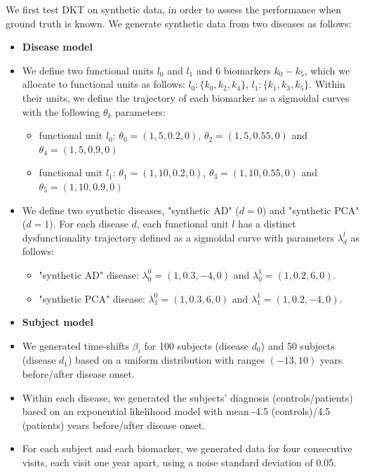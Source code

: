 We first test DKT on synthetic data, in order to assess the performance when ground truth is known. We generate synthetic data from two diseases as follows:
\begin{itemize}
 \item[] \textbf{Disease model}
 \item We define two functional units $l_0$ and $l_1$ and 6 biomarkers $k_0-k_5$, which we allocate to functional units as follows: $l_0:\{k_0, k_2, k_4\}$, $l_1: \{k_1, k_3, k_5\}$. Within their units, we define the trajectory of each biomarker as a sigmoidal curves with the following $\theta_k$ parameters:
 \begin{itemize}
  \item functional unit $l_0$: $\theta_0 = (1,5,0.2,0)$, $\theta_2 = (1,5,0.55,0)$ and $\theta_4 = (1,5,0.9,0)$ 
  \item functional unit $l_1$: $\theta_1 = (1,10,0.2,0)$, $\theta_3 = (1,10,0.55,0)$ and $\theta_5 = (1,10,0.9,0)$ 
 \end{itemize}
 \item We define two synthetic diseases, "synthetic AD" ($d=0$) and "synthetic PCA" ($d=1$). For each disease $d$, each functional unit $l$ has a distinct dysfunctionality trajectory defined as a sigmoidal curve with parameters $\lambda_d^l$ as follows: 
 \begin{itemize}
  \item "synthetic AD" disease: $\lambda_0^0 = (1, 0.3, -4, 0)$  and $\lambda_0^1 = (1, 0.2, 6, 0)$.
  \item "synthetic PCA" disease: $\lambda_1^0 = (1, 0.3, 6, 0)$ and $\lambda_1^1 = (1, 0.2, -4, 0)$.
 \end{itemize}

 \item[] \textbf{Subject model}
 \item We generated time-shifts $\beta_i$ for 100 subjects (disease $d_0$) and 50 subjects (disease $d_1$) based on a uniform distribution with ranges $(-13, 10)$ years before/after disease onset. 
 \item Within each disease, we generated the subjects' diagnosis (controls/patients) based on an exponential likelihood model with mean -4.5 (controls)/4.5 (patients) years before/after disease onset. 
 \item For each subject and each biomarker, we generated data for four consecutive visits, each visit one year apart, using a noise standard deviation of 0.05.
\end{itemize}

